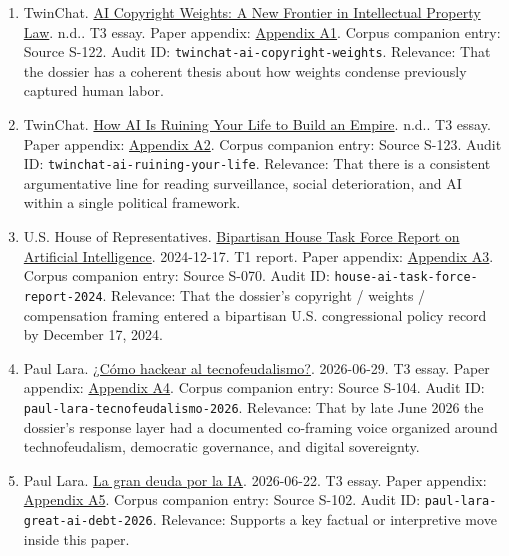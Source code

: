 \documentclass[
  american,
  11pt,
  letterpaper,
]{article}
\providecommand{\tightlist}{%
  \setlength{\itemsep}{0pt}\setlength{\parskip}{0pt}}
\begin{document}
\begin{enumerate}
\def\labelenumi{\arabic{enumi}.}
\tightlist
\item
  TwinChat.
  \href{https://medium.com/twinchat/ai-copyright-weights-a-new-frontier-in-intellectual-property-law-d8ee1b6c55ee}{AI
  Copyright Weights: A New Frontier in Intellectual Property Law}. n.d..
  T3 essay. Paper appendix:
  \hyperref[ch-00-appendix-a1-ai-copyright-weights-a-new-frontier-in-intellectual-property-law]{Appendix
  A1}. Corpus companion entry: Source S-122. Audit ID:
  \texttt{twinchat-ai-copyright-weights}. Relevance: That the dossier
  has a coherent thesis about how weights condense previously captured
  human labor.
\item
  TwinChat.
  \href{https://medium.com/twinchat/how-ai-is-ruining-your-life-to-build-an-empire-8b6d02e55bc9}{How
  AI Is Ruining Your Life to Build an Empire}. n.d.. T3 essay. Paper
  appendix:
  \hyperref[ch-00-appendix-a2-how-ai-is-ruining-your-life-to-build-an-empire]{Appendix
  A2}. Corpus companion entry: Source S-123. Audit ID:
  \texttt{twinchat-ai-ruining-your-life}. Relevance: That there is a
  consistent argumentative line for reading surveillance, social
  deterioration, and AI within a single political framework.
\item
  U.S. House of Representatives.
  \href{https://www.speaker.gov/wp-content/uploads/2024/12/AI-Task-Force-Report-FINAL.pdf}{Bipartisan
  House Task Force Report on Artificial Intelligence}. 2024-12-17. T1
  report. Paper appendix:
  \hyperref[ch-00-appendix-a3-bipartisan-house-task-force-report-on-artificial-intelligence]{Appendix
  A3}. Corpus companion entry: Source S-070. Audit ID:
  \texttt{house-ai-task-force-report-2024}. Relevance: That the
  dossier's copyright / weights / compensation framing entered a
  bipartisan U.S. congressional policy record by December 17, 2024.
\item
  Paul Lara.
  \href{https://www.dineroenimagen.com/paul-lara/como-hackear-al-tecnofeudalismo/186955}{¿Cómo
  hackear al tecnofeudalismo?}. 2026-06-29. T3 essay. Paper appendix:
  \hyperref[ch-00-appendix-a4-c-mo-hackear-al-tecnofeudalismo]{Appendix
  A4}. Corpus companion entry: Source S-104. Audit ID:
  \texttt{paul-lara-tecnofeudalismo-2026}. Relevance: That by late June
  2026 the dossier's response layer had a documented co-framing voice
  organized around technofeudalism, democratic governance, and digital
  sovereignty.
\item
  Paul Lara.
  \href{https://www.dineroenimagen.com/paul-lara/la-gran-deuda-por-la-ia/186930}{La
  gran deuda por la IA}. 2026-06-22. T3 essay. Paper appendix:
  \hyperref[ch-00-appendix-a5-la-gran-deuda-por-la-ia]{Appendix A5}.
  Corpus companion entry: Source S-102. Audit ID:
  \texttt{paul-lara-great-ai-debt-2026}. Relevance: Supports a key
  factual or interpretive move inside this paper.
\end{enumerate}
\end{document}
